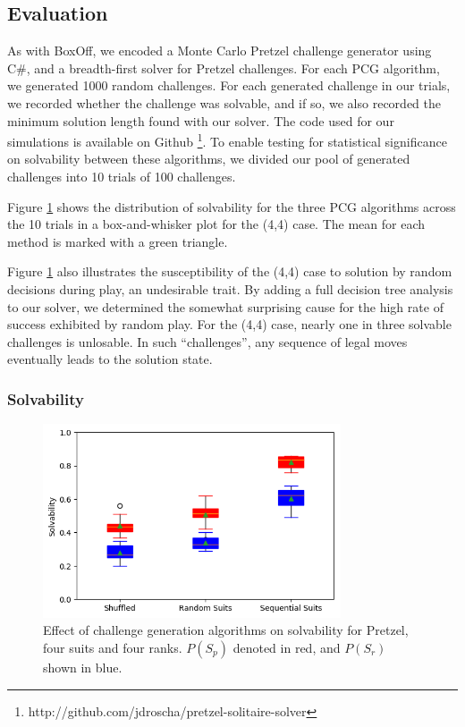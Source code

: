 \documentclass[journal]{IEEEtran}
\begin{document}
\subsection{Evaluation}

As with BoxOff, we encoded a Monte Carlo Pretzel challenge generator using C\#, and a breadth-first solver for Pretzel challenges. For each PCG algorithm, we generated 1000 random challenges. For each generated challenge in our trials, we recorded whether the challenge was solvable, and if so, we also recorded the minimum solution length found with our solver. The code used for our simulations is available on Github \footnote{http://github.com/jdroscha/pretzel-solitaire-solver}. To enable testing for statistical significance on solvability between these algorithms, we divided our pool of generated challenges into 10 trials of 100 challenges. 

Figure \ref{fig:pretzel44solved} shows the distribution of solvability for the three PCG algorithms across the 10 trials in a box-and-whisker plot for the (4,4) case. The mean for each method is marked with a green triangle.

Figure \ref{fig:pretzel44solved} also illustrates the susceptibility of the (4,4) case to solution by random decisions during play, an undesirable trait. By adding a full decision tree analysis to our solver, we determined the somewhat surprising cause for the high rate of success exhibited by random play. For the (4,4) case, nearly one in three solvable challenges is unlosable. In such ``challenges'', any sequence of legal moves eventually leads to the solution state.


\subsubsection{Solvability}

\begin{figure}[t]
\includegraphics[width=8.8cm]{pretzelsolve4x4.png}
\caption{Effect of challenge generation algorithms on solvability for Pretzel, four suits and four ranks. $P(S_p)$ denoted in red, and $P(S_r)$ shown in blue.}
\label{fig:pretzel44solved}
\end{figure}
\end{document}
